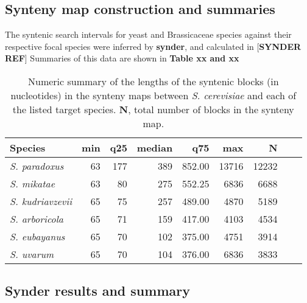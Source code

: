 \FloatBarrier
\subsection{Synteny map construction and summaries}

The syntenic search intervals for yeast and Brassicaceae species against their respective focal species were inferred by \textbf{synder}, and calculated in [\textbf{SYNDER REF}] Summaries of this data are shown in \textbf{Table xx and xx}


\begin{table}[hbpt]
  \centering
  \caption{Numeric summary of the lengths of the syntenic blocks (in
  nucleotides) in the synteny maps between \textit{S. cerevisiae} and each of
  the listed target species. \textbf{N}, total number of blocks in the synteny map.}
  \label{tab:synmap-summary}
  \begin{tabular}{lrrrrrrrr}
    Species                  & min & q25 & median &    q75 &   max &     N \\
    \hline
    \textit{S. paradoxus}    &  63 & 177 &    389 & 852.00 & 13716 & 12232 \\
    \textit{S. mikatae}      &  63 &  80 &    275 & 552.25 &  6836 &  6688 \\
    \textit{S. kudriavzevii} &  65 &  75 &    257 & 489.00 &  4870 &  5189 \\
    \textit{S. arboricola}   &  65 &  71 &    159 & 417.00 &  4103 &  4534 \\
    \textit{S. eubayanus}    &  65 &  70 &    102 & 375.00 &  4751 &  3914 \\
    \textit{S. uvarum}       &  65 &  70 &    104 & 376.00 &  6836 &  3833 \\
  \end{tabular}
\end{table}

\FloatBarrier
\subsection{Synder results and summary}
\FloatBarrier

